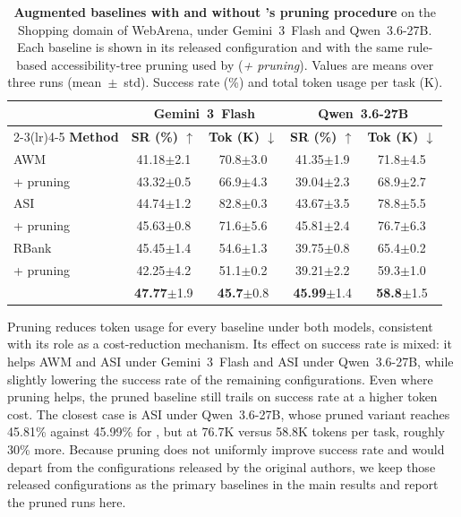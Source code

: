 \begin{table}[ht]
\centering
\small
\begin{tabular}{lcccc}
\toprule
 & \multicolumn{2}{c}{\textbf{Gemini~3~Flash}} & \multicolumn{2}{c}{\textbf{Qwen~3.6-27B}} \\
\cmidrule(lr){2-3}\cmidrule(lr){4-5}
\textbf{Method} & \textbf{SR (\%) $\uparrow$} & \textbf{Tok (K) $\downarrow$} & \textbf{SR (\%) $\uparrow$} & \textbf{Tok (K) $\downarrow$} \\
\midrule
AWM              & 41.18{\scriptsize $\pm$2.1} & 70.8{\scriptsize $\pm$3.0} & 41.35{\scriptsize $\pm$1.9} & 71.8{\scriptsize $\pm$4.5} \\
\quad + pruning  & 43.32{\scriptsize $\pm$0.5} & 66.9{\scriptsize $\pm$4.3} & 39.04{\scriptsize $\pm$2.3} & 68.9{\scriptsize $\pm$2.7} \\
ASI              & 44.74{\scriptsize $\pm$1.2} & 82.8{\scriptsize $\pm$0.3} & 43.67{\scriptsize $\pm$3.5} & 78.8{\scriptsize $\pm$5.5} \\
\quad + pruning  & 45.63{\scriptsize $\pm$0.8} & 71.6{\scriptsize $\pm$5.6} & 45.81{\scriptsize $\pm$2.4} & 76.7{\scriptsize $\pm$6.3} \\
RBank            & 45.45{\scriptsize $\pm$1.4} & 54.6{\scriptsize $\pm$1.3} & 39.75{\scriptsize $\pm$0.8} & 65.4{\scriptsize $\pm$0.2} \\
\quad + pruning  & 42.25{\scriptsize $\pm$4.2} & 51.1{\scriptsize $\pm$0.2} & 39.21{\scriptsize $\pm$2.2} & 59.3{\scriptsize $\pm$1.0} \\
\midrule
\budgetactor{}   & \textbf{47.77}{\scriptsize $\pm$1.9} & \textbf{45.7}{\scriptsize $\pm$0.8} & \textbf{45.99}{\scriptsize $\pm$1.4} & \textbf{58.8}{\scriptsize $\pm$1.5} \\
\bottomrule
\end{tabular}
\caption{\textbf{Augmented baselines with and without \budgetactor{}'s pruning procedure} on the Shopping domain of WebArena, under Gemini~3~Flash and Qwen~3.6-27B. Each baseline is shown in its released configuration and with the same rule-based accessibility-tree pruning used by \budgetactor{} (\emph{+ pruning}). Values are means over three runs (mean~$\pm$~{\scriptsize std}). Success rate (\%) and total token usage per task (K).}
\label{tab:baseline-pruning}
\end{table}

Pruning reduces token usage for every baseline under both models, consistent with its role as a cost-reduction mechanism.
Its effect on success rate is mixed: it helps AWM and ASI under Gemini~3~Flash and ASI under Qwen~3.6-27B, while slightly lowering the success rate of the remaining configurations.
Even where pruning helps, the pruned baseline still trails \budgetactor{} on success rate at a higher token cost.
The closest case is ASI under Qwen~3.6-27B, whose pruned variant reaches 45.81\% against 45.99\% for \budgetactor{}, but at 76.7K versus 58.8K tokens per task, roughly 30\% more.
Because pruning does not uniformly improve success rate and would depart from the configurations released by the original authors, we keep those released configurations as the primary baselines in the main results and report the pruned runs here.


